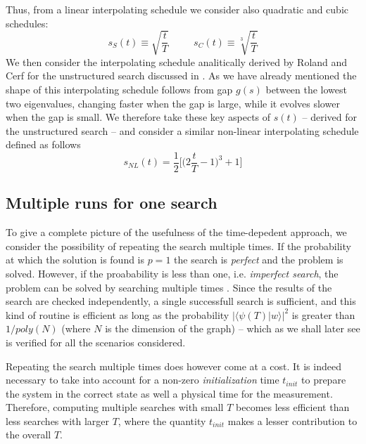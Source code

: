         Thus, from a linear interpolating schedule we consider also quadratic and cubic schedules:
        \begin{equation}
          s_S(t) \equiv \sqrt{\frac{t}{T}} \hspace{30pt} s_C(t) \equiv \sqrt[3]{\frac{t}{T}}
        \end{equation}
        We then consider the interpolating schedule analitically derived by Roland and Cerf for the unstructured search discussed in . As we have already mentioned the shape of this interpolating schedule follows from gap $g(s)$ between the lowest two eigenvalues, changing faster when the gap is large, while it evolves slower when the gap is small. We therefore take these key aspects of $s(t)$ -- derived for the unstructured search -- and consider a similar non-linear interpolating schedule defined as follows
        \begin{equation}
            s_{NL}(t) = \frac{1}{2}\Big[\Big(2\frac{t}{T}-1\Big)^{3}+1\Big]
        \end{equation}
        


        \subsection{Multiple runs for one search}\label{subsec:multiple_runs}
        To give a complete picture of the usefulness of the time-depedent approach, we consider the possibility of repeating the search multiple times. If the probability at which the solution is found is $p=1$ the search is \textit{perfect} and the problem is solved. However, if the proabability is less than one, i.e. \textit{imperfect search}, the problem can be solved by searching multiple times . Since the results of the search are checked independently, a single successfull search is sufficient, and this kind of routine is efficient as long as the probability $\big|\langle\psi(T)| w\rangle\big|^2$ is greater than $1/poly(N)$ (where $N$ is the dimension of the graph) \cite{Morley2018} -- which as we shall later see is verified for all the scenarios considered.

        Repeating the search multiple times does however come at a cost. It is indeed necessary to take into account for a non-zero \textit{initialization} time $t_{init}$ to prepare the system in the correct state as well a physical time for the measurement. Therefore, computing multiple searches with small $T$ becomes less efficient than less searches with larger $T$, where the quantity $t_{init}$ makes a lesser contribution to the overall $T$.

